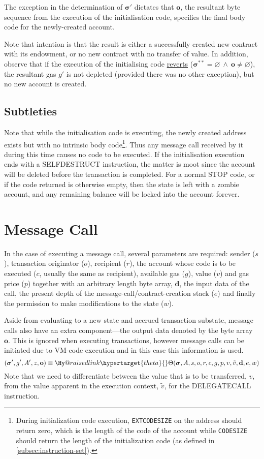 \documentclass[9pt,oneside]{amsart}
\makeatletter
\newcommand{\linkdest}[1]{\Hy@raisedlink{\hypertarget{#1}{}}}
\makeatother
\begin{document}
\begin{multicols}{2}
The exception in the determination of $\boldsymbol{\sigma}'$ dictates that $\mathbf{o}$, the resultant byte sequence from the execution of the initialisation code, specifies the final body code for the newly-created account.

Note that intention is that the result is either a successfully created new contract with its endowment, or no new contract with no transfer of value.
In addition, observe that if the execution of the initialising code \hyperlink{REVERT}{reverts} ($\boldsymbol{\sigma}^{**} = \varnothing \ \wedge\ \mathbf{o} \neq \varnothing$), the resultant gas $g'$ is not depleted (provided there was no other exception), but no new account is created.

\subsection{Subtleties}
Note that while the initialisation code is executing, the newly created address exists but with no intrinsic body code\footnote{During initialization code execution, \texttt{EXTCODESIZE} on the address should return zero, which is the length of the code of the account while \texttt{CODESIZE} should return the length of the initialization code (as defined in \ref{subsec:instruction-set}).}. Thus any message call received by it during this time causes no code to be executed. If the initialisation execution ends with a {\small SELFDESTRUCT} instruction, the matter is moot since the account will be deleted before the transaction is completed. For a normal {\small STOP} code, or if the code returned is otherwise empty, then the state is left with a zombie account, and any remaining balance will be locked into the account forever.

\section{Message Call} \label{ch:call}
In the case of executing a message call, several parameters are required: sender ($s$), transaction originator ($o$), recipient ($r$), the account whose code is to be executed ($c$, usually the same as recipient), available gas ($g$), value ($v$) and gas price ($p$) together with an arbitrary length byte array, $\mathbf{d}$, the input data of the call, the present depth of the message-call/contract-creation stack ($e$) and finally the permission to make modifications to the state ($w$).

Aside from evaluating to a new state and accrued transaction substate, message calls also have an extra component---the output data denoted by the byte array~$\mathbf{o}$. This is ignored when executing transactions, however message calls can be initiated due to VM-code execution and in this case this information is used.
\begin{equation}
(\boldsymbol{\sigma}', g', A', z, \mathbf{o}) \equiv \linkdest{theta}{\Theta}(\boldsymbol{\sigma}, A, s, o, r, c, g, p, v, \tilde{v}, \mathbf{d}, e, w)
\end{equation}
Note that we need to differentiate between the value that is to be transferred, $v$, from the value apparent in the execution context, $\tilde{v}$, for the {\small DELEGATECALL} instruction.


\end{multicols}
\end{document}

